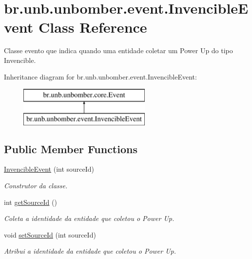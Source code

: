 \hypertarget{classbr_1_1unb_1_1unbomber_1_1event_1_1_invencible_event}{\section{br.\+unb.\+unbomber.\+event.\+Invencible\+Event Class Reference}
\label{classbr_1_1unb_1_1unbomber_1_1event_1_1_invencible_event}
}


Classe evento que indica quando uma entidade coletar um Power Up do tipo Invencible.  


Inheritance diagram for br.\+unb.\+unbomber.\+event.\+Invencible\+Event\+:\begin{figure}[H]
\begin{center}
\leavevmode
\includegraphics[height=2.000000cm]{classbr_1_1unb_1_1unbomber_1_1event_1_1_invencible_event}
\end{center}
\end{figure}
\subsection*{Public Member Functions}
\begin{DoxyCompactItemize}
\item 
\hyperlink{classbr_1_1unb_1_1unbomber_1_1event_1_1_invencible_event_acfb53a1e124446f82acb73de57b80f0f}{Invencible\+Event} (int source\+Id)
\begin{DoxyCompactList}\small\item\em Construtor da classe. \end{DoxyCompactList}\item 
int \hyperlink{classbr_1_1unb_1_1unbomber_1_1event_1_1_invencible_event_aa410ba1c32a3e2b20a814abd0c44c3cb}{get\+Source\+Id} ()
\begin{DoxyCompactList}\small\item\em Coleta a identidade da entidade que coletou o Power Up. \end{DoxyCompactList}\item 
void \hyperlink{classbr_1_1unb_1_1unbomber_1_1event_1_1_invencible_event_ab116da261e80fe4933dfc18f1d6409f7}{set\+Source\+Id} (int source\+Id)
\begin{DoxyCompactList}\small\item\em Atribui a identidade da entidade que coletou o Power Up. \end{DoxyCompactList}\end{DoxyCompactItemize}


